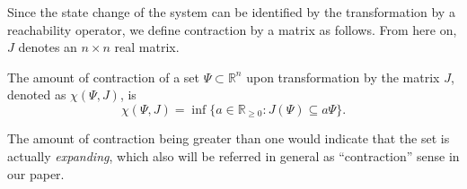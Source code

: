 Since the state change of the system can be identified by the
transformation by a reachability operator, we define contraction by
a matrix as follows.  From here on, $J$ denotes an
$n\times n$ real matrix.
%
\begin{defn} The amount of contraction of a set
  $\Psi\subset\mathbb{R}^n$ upon transformation by the matrix $J$,
  denoted as $\chi(\Psi,J)$, is $$\chi(\Psi,J) =
  \inf\{a\in\mathbb{R}_{\geq 0} : J(\Psi)\subseteq a
  \Psi\}.$$ \end{defn}
The amount of contraction being greater than one would indicate that
the set is actually \emph{expanding}, which also will be referred in
general
as ``contraction'' sense in our paper.
%


